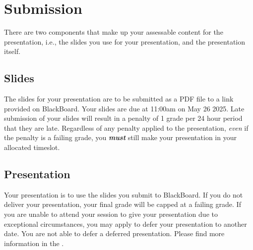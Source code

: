 \documentclass{csse4400}
\begin{document}


\section{Submission}


There are two components that make up your assessable content for the presentation, i.e., the slides you use for your presentation, and the presentation itself.


\subsection{Slides}
The slides for your presentation are to be submitted as a PDF file to a link provided on BlackBoard.
Your slides are due at 11:00am on May 26 2025.
Late submission of your slides will result in a penalty of 1 grade per 24 hour period that they are late.
Regardless of any penalty applied to the presentation, \emph{even} if the penalty is a failing grade,
you \textbf{\textit{must}} still make your presentation in your allocated timeslot.

\subsection{Presentation}
Your presentation is to use the slides you submit to BlackBoard.
If you do not deliver your presentation, your final grade will be capped at a failing grade.
If you are unable to attend your session to give your presentation due to exceptional circumstances,
you may apply to defer your presentation to another date.
You are not able to defer a deferred presentation.
Please find more information in the .
\end{document}
